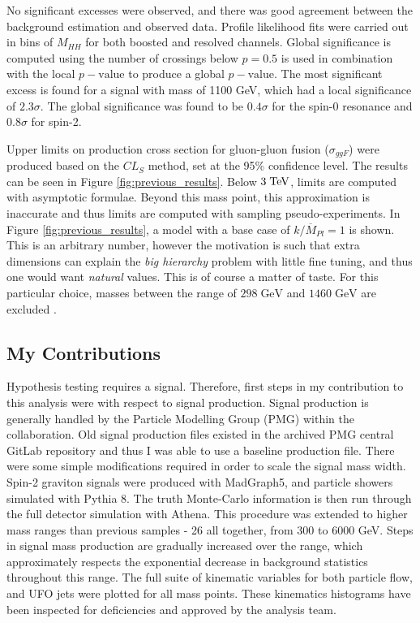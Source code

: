 \documentclass[12pt]{article}
\begin{document}
No significant excesses were observed, and there was good agreement between the
background estimation and observed data. Profile likelihood fits were carried
out in bins of $M_{HH}$ for both boosted and resolved channels. Global
significance is computed using the number of crossings below $p=0.5$ is used in
combination with the local $p-\text{value}$ to produce a global
$p-\text{value}$. The most significant excess is found for a signal with mass of
1100 GeV, which had a local significance of $2.3\sigma$. The global significance
was found to be $0.4\sigma$ for the spin-0 resonance and $0.8\sigma$ for spin-2.

Upper limits on production cross section for gluon-gluon fusion ($\sigma_{ggF}$)
were produced based on the $CL_S$ method, set at the 95\% confidence level. The
results can be seen in Figure \ref{fig:previous_results}. Below $3\;\text{TeV}$,
limits are computed with asymptotic formulae. Beyond this mass point, this
approximation is inaccurate and thus limits are computed with sampling
pseudo-experiments. In Figure \ref{fig:previous_results}, a model with a base
case of $k/\overline{M}_{Pl}=1$ is shown. This is an arbitrary number, however
the motivation is such that extra dimensions can explain the \textit{big
hierarchy} problem with little fine tuning, and thus one would want
\textit{natural} values. This is of course a matter of taste. For this
particular choice, masses between the range of $298\;\text{GeV}$ and
$1460\;\text{GeV}$ are excluded \cite{atlas_resonant_2022}. 

\subsection{My Contributions}

Hypothesis testing requires a signal. Therefore, first steps in my contribution
to this analysis were with respect to signal production. Signal production is
generally handled by the Particle Modelling Group (PMG) within the
collaboration. Old signal production files existed in the archived PMG central
GitLab repository and thus I was able to use a baseline production file. There
were some simple modifications required in order to scale the signal mass width.
Spin-2 graviton signals were produced with MadGraph5, and particle showers
simulated with Pythia 8. The truth Monte-Carlo information is then run through
the full detector simulation with Athena. This procedure was extended to higher
mass ranges than previous samples - 26 all together, from 300 to 6000 GeV. Steps
in signal mass production are gradually increased over the range, which
approximately respects the exponential decrease in background statistics
throughout this range. The full suite of kinematic variables for both particle
flow, and UFO jets were plotted for all mass points. These kinematics histograms
have been inspected for deficiencies and approved by the analysis team.
\end{document}
